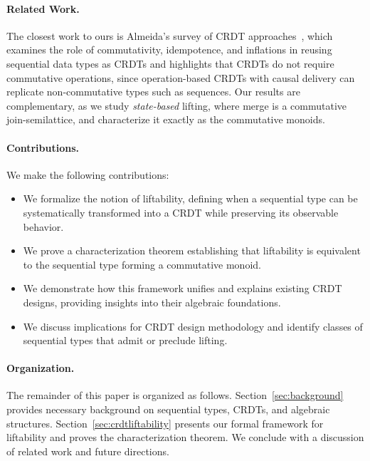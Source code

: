 \paragraph{Related Work.} The closest work to ours is Almeida's survey of CRDT
approaches~\cite{DBLP:journals/csur/Almeida25}, which examines the role of
commutativity, idempotence, and inflations in reusing sequential data types as
CRDTs and highlights that CRDTs do not require commutative operations, since
operation-based CRDTs with causal delivery can replicate non-commutative types
such as sequences. Our results are complementary, as we study
\emph{state-based} lifting, where merge is a commutative join-semilattice, and
characterize it exactly as the commutative monoids.

\paragraph{Contributions.} We make the following contributions:
\begin{itemize}
\item We formalize the notion of liftability, defining when a sequential type can be systematically transformed into a CRDT while preserving its observable behavior.
\item We prove a characterization theorem establishing that liftability is equivalent to the sequential type forming a commutative monoid.
\item We demonstrate how this framework unifies and explains existing CRDT designs, providing insights into their algebraic foundations.
\item We discuss implications for CRDT design methodology and identify classes of sequential types that admit or preclude lifting.
\end{itemize}

\paragraph{Organization.} The remainder of this paper is organized as follows. Section~\ref{sec:background} provides necessary background on sequential types, CRDTs, and algebraic structures. Section~\ref{sec:crdtliftability} presents our formal framework for liftability and proves the characterization theorem. We conclude with a discussion of related work and future directions.
